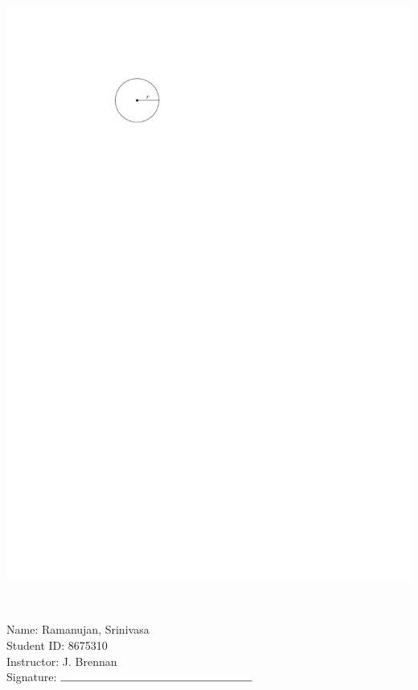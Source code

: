 \documentclass[12pt]{amsart}
\begin{document}
\begin{enumerate}
\includegraphics[scale = 0.8]{circle}

\vspace{1cm}
\newpage  $ $   \newpage\end{enumerate}\graphicspath{{C:/Users/iainc/anaconda3/Randomizer/Sample Course/Sample Assessment/}}\setcounter{page}{1}


\thispagestyle{fancy}

 \noindent Name: Ramanujan, Srinivasa \vspace{.3cm} \\\noindent Student ID: 8675310 \vspace{.3cm} \\\noindent Instructor: J. Brennan \vspace{.3cm} \\\noindent Signature: $\rule{6cm}{0.15mm}$ \vspace{.3cm} \\ 
\end{document}
